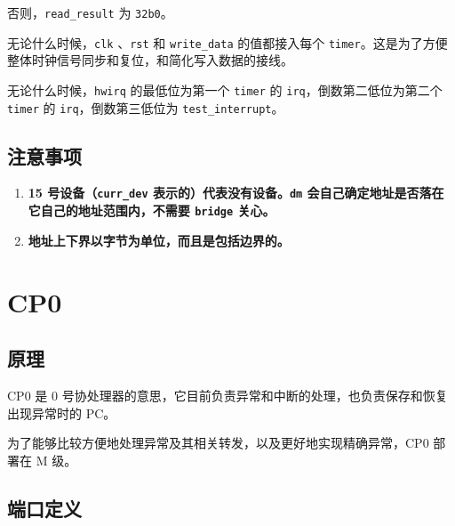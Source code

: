 \documentclass[12pt,AutoFakeBold,AutoFakeSlant]{article}
\providecommand{\tightlist}{%
  \setlength{\itemsep}{0pt}\setlength{\parskip}{0pt}}
\newcommand{\ms}[1]{\texttt{#1}}
\begin{document}
否则，\texttt{read\_result} 为 \texttt{32\textquotesingle{}b0}。

无论什么时候，\texttt{clk} 、\texttt{rst} 和 \ms{write\_data} 的值都接入每个
\texttt{timer}。这是为了方便整体时钟信号同步和复位，和简化写入数据的接线。

无论什么时候，\texttt{hwirq}
的最低位为第一个 \texttt{timer} 的 \texttt{irq}，倒数第二低位为第二个
\texttt{timer} 的 \texttt{irq}，倒数第三低位为 \ms{test\_interrupt}。

\hypertarget{ux6ce8ux610fux4e8bux9879-7}{%
\subsection{注意事项}\label{ux6ce8ux610fux4e8bux9879-7}}

\begin{enumerate}
\def\labelenumi{\arabic{enumi}.}
\tightlist
\item
  \textbf{15 号设备（\texttt{curr\_dev} 表示的）代表没有设备。\ms{dm} 会自己确定地址是否落在它自己的地址范围内，不需要 \ms{bridge} 关心。}
\item
  \textbf{地址上下界以字节为单位，而且是包括边界的。}
\end{enumerate}

\hypertarget{cp0}{%
\section{CP0}\label{cp0}}

\hypertarget{ux539fux7406-10}{%
\subsection{原理}\label{ux539fux7406-10}}

CP0 是 0 号协处理器的意思，它目前负责异常和中断的处理，也负责保存和恢复出现异常时的 PC。

为了能够比较方便地处理异常及其相关转发，以及更好地实现精确异常，CP0 部署在 M 级。

\hypertarget{ux7aefux53e3ux5b9aux4e49-8}{%
\subsection{端口定义}\label{ux7aefux53e3ux5b9aux4e49-8}}
\end{document}
